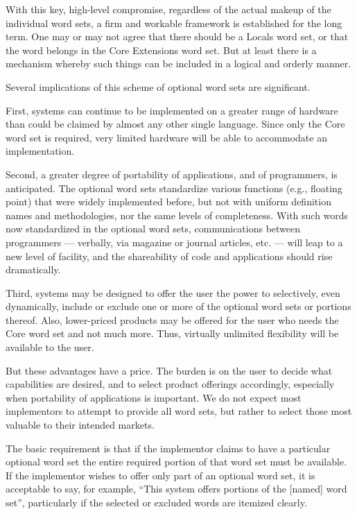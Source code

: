 With this key, high-level compromise, regardless of the actual
makeup of the individual word sets, a firm and workable framework
is established for the long term. One may or may not agree that
there should be a Locals word set, or that the word 
belongs in the Core Extensions word set. But at least there is a
mechanism whereby such things can be included in a logical and
orderly manner.

Several implications of this scheme of optional word sets are
significant.

First,  systems can continue to be implemented on a greater
range of hardware than could be claimed by almost any other single
language. Since only the Core word set is required, very limited
hardware will be able to accommodate an  implementation.

Second, a greater degree of portability of applications, and of
programmers, is anticipated. The optional word sets standardize
various functions (e.g., floating point) that were widely implemented
before, but not with uniform definition names and methodologies, nor
the same levels of completeness. With such words now standardized in
the optional word sets, communications between programmers ---
verbally, via magazine or journal articles, etc. --- will leap to a
new level of facility, and the shareability of code and applications
should rise dramatically.

Third,  systems may be designed to offer the user the power
to selectively, even dynamically, include or exclude one or more of
the optional word sets or portions thereof. Also, lower-priced
products may be offered for the user who needs the Core word set
and not much more. Thus, virtually unlimited flexibility will be
available to the user.

But these advantages have a price. The burden is on the user to
decide what capabilities are desired, and to select product
offerings accordingly, especially when portability of applications
is important. We do not expect most implementors to attempt to
provide all word sets, but rather to select those most valuable to
their intended markets.

The basic requirement is that if the implementor claims to have a
particular optional word set the entire required portion of that
word set must be available. If the implementor wishes to offer only
part of an optional word set, it is acceptable to say, for example,
``This system offers portions of the [named] word set'', particularly
if the selected or excluded words are itemized clearly.

